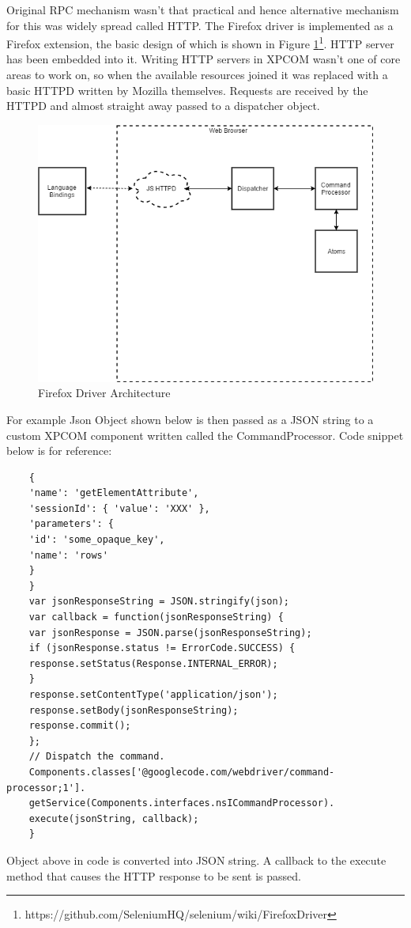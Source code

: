 \documentclass[article,type=msc,colorback,accentcolor=tud9c,twoside,11pt]{tudthesis}
\begin{document}
	Original RPC mechanism wasn't that practical and hence alternative mechanism for this was widely spread called HTTP. The Firefox driver is implemented as a Firefox extension, the basic design of which is shown in Figure \ref{fig:Flowchart}\footnote{https://github.com/SeleniumHQ/selenium/wiki/FirefoxDriver}. HTTP server has been embedded into it. Writing HTTP servers in XPCOM wasn't one of core areas to work on, so when the available resources joined it was replaced with a basic HTTPD written by Mozilla themselves. Requests are received by the HTTPD and almost straight away passed to a dispatcher object.
	\begin{figure}[h]
		\centering
		\includegraphics[scale=0.6]{SeleniumHttp.PNG}
		\caption{Firefox Driver Architecture}
		\label{fig:Flowchart}
	\end{figure}
	For example Json Object shown below is then passed as a JSON string to a custom XPCOM component written called the CommandProcessor. Code snippet below is for reference:
	\begin{lstlisting}
	{
	'name': 'getElementAttribute',
	'sessionId': { 'value': 'XXX' },
	'parameters': {
	'id': 'some_opaque_key',
	'name': 'rows'
	}
	}
	var jsonResponseString = JSON.stringify(json);
	var callback = function(jsonResponseString) {
	var jsonResponse = JSON.parse(jsonResponseString);
	if (jsonResponse.status != ErrorCode.SUCCESS) {
	response.setStatus(Response.INTERNAL_ERROR);
	}
	response.setContentType('application/json');
	response.setBody(jsonResponseString);
	response.commit();
	};
	// Dispatch the command.
	Components.classes['@googlecode.com/webdriver/command-processor;1'].
	getService(Components.interfaces.nsICommandProcessor).
	execute(jsonString, callback);
	}
	\end{lstlisting}
	Object above in code is converted into JSON string. A callback to the execute method that causes the HTTP response to be sent is passed.
	
\end{document}
